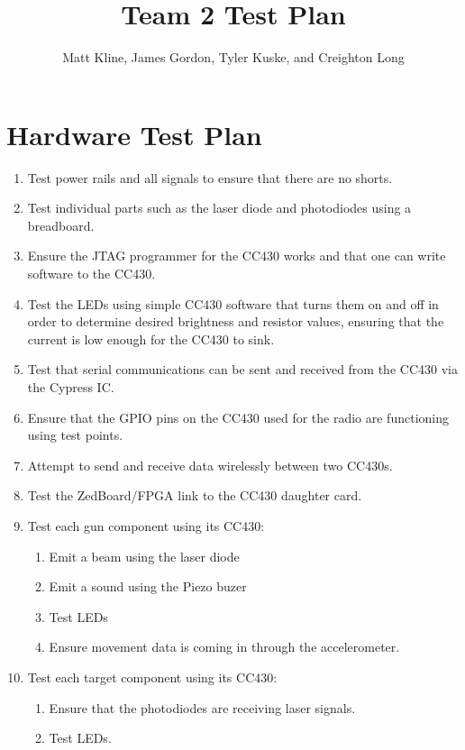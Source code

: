 \documentclass{article}
\title{Team 2 Test Plan}
\author{Matt Kline, James Gordon, Tyler Kuske, and Creighton Long}
\begin{document}
\maketitle

\section*{Hardware Test Plan}

\begin{enumerate}
\item Test power rails and all signals to ensure that there are no shorts.
\item Test individual parts such as the laser diode and photodiodes using a breadboard.
\item Ensure the JTAG programmer for the CC430 works and that one can write software to the CC430.
\item Test the LEDs using simple CC430 software that turns them on and off in order to determine desired brightness
	and resistor values, ensuring that the current is low enough for the CC430 to sink.
\item Test that serial communications can be sent and received from the CC430 via the Cypress IC.
\item Ensure that the GPIO pins on the CC430 used for the radio are functioning using test points.
\item Attempt to send and receive data wirelessly between two CC430s.
\item Test the ZedBoard/FPGA link to the CC430 daughter card.
\item Test each gun component using its CC430:
	\begin{enumerate}
	\item Emit a beam using the laser diode
	\item Emit a sound using the Piezo buzer
	\item Test LEDs
	\item Ensure movement data is coming in through the accelerometer.
	\end{enumerate}
\item Test each target component using its CC430:
	\begin{enumerate}
	\item Ensure that the photodiodes are receiving laser signals.
	\item Test LEDs.
	\end{enumerate}
\end{enumerate}
\end{document}
